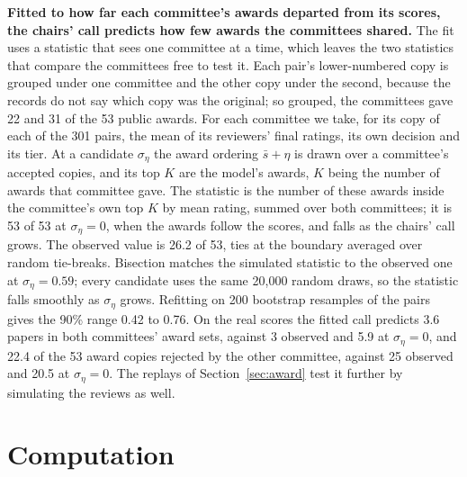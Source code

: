 \documentclass{article}
\begin{document}
\textbf{Fitted to how far each committee's awards departed from its scores, the chairs' call predicts how few awards the committees shared.} The fit uses a statistic that sees one committee at a time, which leaves the two statistics that compare the committees free to test it. Each pair's lower-numbered copy is grouped under one committee and the other copy under the second, because the records do not say which copy was the original; so grouped, the committees gave 22 and 31 of the 53 public awards. For each committee we take, for its copy of each of the 301 pairs, the mean of its reviewers' final ratings, its own decision and its tier. At a candidate $\sigma_\eta$ the award ordering $\bar s+\eta$ is drawn over a committee's accepted copies, and its top $K$ are the model's awards, $K$ being the number of awards that committee gave. The statistic is the number of these awards inside the committee's own top $K$ by mean rating, summed over both committees; it is 53 of 53 at $\sigma_\eta=0$, when the awards follow the scores, and falls as the chairs' call grows. The observed value is 26.2 of 53, ties at the boundary averaged over random tie-breaks. Bisection matches the simulated statistic to the observed one at $\sigma_\eta=0.59$; every candidate uses the same 20,000 random draws, so the statistic falls smoothly as $\sigma_\eta$ grows. Refitting on 200 bootstrap resamples of the pairs gives the 90\% range 0.42 to 0.76. On the real scores the fitted call predicts 3.6 papers in both committees' award sets, against 3 observed and 5.9 at $\sigma_\eta=0$, and 22.4 of the 53 award copies rejected by the other committee, against 25 observed and 20.5 at $\sigma_\eta=0$. The replays of Section~\ref{sec:award} test it further by simulating the reviews as well.

\section{Computation}\label{app:computation}
\end{document}
